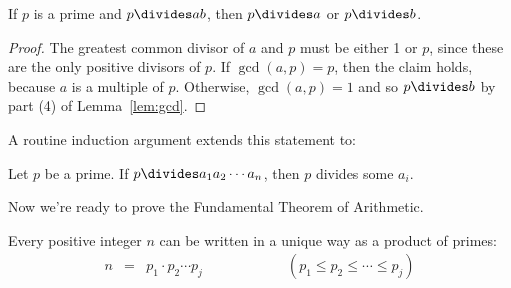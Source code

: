 \begin{lemma}
\label{lem:prime-divides}
If $p$ is a prime and $p \divides ab$, then $p \divides a$ or $p \divides b$.
\end{lemma}

\begin{proof}
The greatest common divisor of $a$ and $p$ must be either 1 or $p$,
since these are the only positive divisors of $p$.  If $\gcd(a, p) = p$, 
then the claim holds, because $a$ is a multiple of $p$.  Otherwise,
$\gcd(a, p) = 1$ and so $p \divides b$ by part (4) of Lemma~\ref{lem:gcd}.
\end{proof}

A routine induction argument extends this statement to:

\begin{lemma}
\label{lem:prime-divides-ind}
Let $p$ be a prime.  If $p \divides a_1 a_2 \cdots a_n$, then $p$ divides
some $a_i$.
\end{lemma}

Now we're ready to prove the Fundamental Theorem of Arithmetic.

\begin{theorem}
Every positive integer $n$ can be written in a unique way as a product
of primes:
\begin{eqnarray*}
n & = & p_1 \cdot p_2 \cdots p_j
\hspace{1in}
(p_1 \leq p_2 \leq \cdots \leq p_j)
\end{eqnarray*}
\end{theorem}

